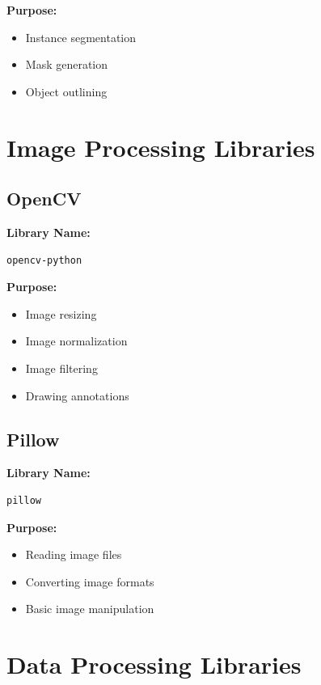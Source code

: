 \documentclass[12pt]{article}
\begin{document}
\textbf{Purpose:}
\begin{itemize}
    \item Instance segmentation
    \item Mask generation
    \item Object outlining
\end{itemize}

\section{Image Processing Libraries}

\subsection{OpenCV}

\textbf{Library Name:}
\begin{verbatim}
opencv-python
\end{verbatim}

\textbf{Purpose:}
\begin{itemize}
    \item Image resizing
    \item Image normalization
    \item Image filtering
    \item Drawing annotations
\end{itemize}

\subsection{Pillow}

\textbf{Library Name:}
\begin{verbatim}
pillow
\end{verbatim}

\textbf{Purpose:}
\begin{itemize}
    \item Reading image files
    \item Converting image formats
    \item Basic image manipulation
\end{itemize}

\section{Data Processing Libraries}
\end{document}
